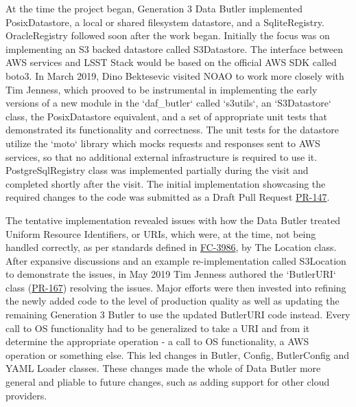 At the time the \poc project began, Generation 3 Data Butler implemented PosixDatastore, a local or shared filesystem datastore, and a SqliteRegistry. OracleRegistry followed soon after the \poc work began. Initially the focus was on implementing an S3 backed datastore called S3Datastore. The interface between AWS services and LSST Stack would be based on the official AWS SDK called boto3. In March 2019, Dino Bektesevic visited NOAO to work more closely with Tim Jenness, which prooved to be instrumental in implementing the early versions of a new module in the `daf\_butler` called `s3utils`, an `S3Datastore` class, the PosixDatastore equivalent, and a set of appropriate unit tests that demonstrated its functionality and correctness. The unit tests for the datastore utilize the `moto` library which mocks requests and responses sent to AWS services, so that no additional external infrastructure is required to use it. PostgreSqlRegistry class was implemented partially during the visit and completed shortly after the visit. The initial implementation showcasing the required changes to the code was submitted as a Draft Pull Request \href{https://github.com/lsst/daf_butler/pull/147}{PR-147}. 

The tentative implementation revealed issues with how the Data Butler treated Uniform Resource Identifiers, or URIs, which were, at the time, not being handled correctly, as per standards defined in \href{https://tools.ietf.org/html/rfc3986}{FC-3986}, by The Location class. After expansive discussions and an example re-implementation called S3Location to demonstrate the issues, in May 2019 Tim Jenness authored the `ButlerURI` class (\href{https://github.com/lsst/daf_butler/pull/167}{PR-167}) resolving the issues. Major efforts were then invested into refining the newly added code to the level of production quality as well as updating the remaining Generation 3 Butler to use the updated ButlerURI code instead. Every call to OS functionality had to be generalized to take a URI and from it determine the appropriate operation - a call to OS functionality, a AWS operation or something else. This led changes in Butler, Config, ButlerConfig and YAML Loader classes. These changes made the whole of Data Butler more general and pliable to future changes, such as adding support for other cloud providers. 

